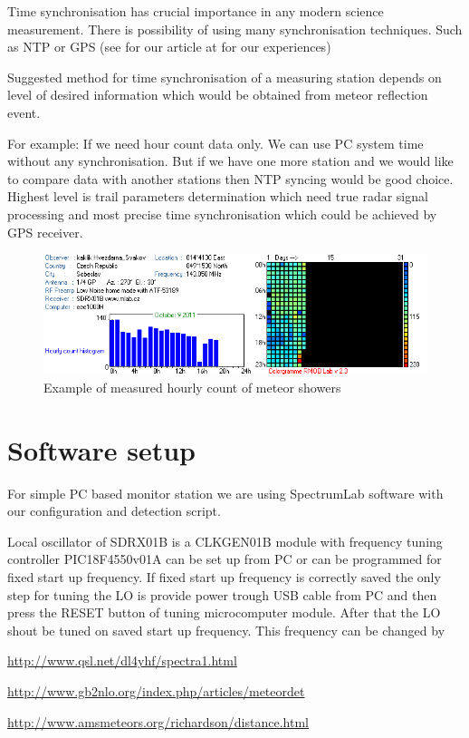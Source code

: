 \documentclass[12pt,a4paper,oneside]{article}
\begin{document}
Time synchronisation has crucial importance in any modern science measurement. There is possibility of using many synchronisation techniques. Such as NTP or GPS (see for our article at  for our experiences)

Suggested method for time synchronisation of a measuring station depends on level of desired information which would be obtained from meteor reflection event.    

For example: If we need hour count data only. We can use PC system time without any synchronisation. But if we have one more station and we would like to compare data with another stations then NTP syncing would be good choice.  Highest level is trail parameters determination which need true radar signal processing  and most precise time synchronisation which could be achieved by GPS receiver.

\begin{figure}[htbp]
\begin{center}
\includegraphics [width=150mm] {./img/colorgram.png} 
\end{center}
\caption{Example of measured hourly count of meteor showers}   
\end{figure}

\section{Software setup}

For simple PC based monitor station we are using SpectrumLab software with   our configuration and detection script. 

Local oscillator of SDRX01B is a CLKGEN01B module with frequency tuning controller  PIC18F4550v01A can be set up from PC or can be programmed for fixed start up frequency. If fixed start up frequency is correctly saved the only step for tuning the LO is provide power trough USB cable from PC and then press the RESET button of tuning microcomputer module. After that the LO shout be tuned on saved start up frequency. This frequency can be changed by   

\begin{thebibliography}{99}
\href{http://www.qsl.net/dl4yhf/spectra1.html}{http://www.qsl.net/dl4yhf/spectra1.html}

\href{http://www.gb2nlo.org/index.php/articles/meteordet}{http://www.gb2nlo.org/index.php/articles/meteordet}

\href{http://www.amsmeteors.org/richardson/distance.html}{http://www.amsmeteors.org/richardson/distance.html}




\end{thebibliography}
\end{document}
